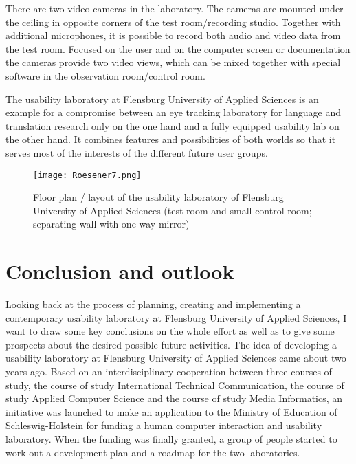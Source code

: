 \begin{
}[h]
\begin{styleBodyTextIndent}
There are two video cameras in the laboratory. The cameras are mounted under the ceiling in opposite corners of the test room/recording studio. Together with additional microphones, it is possible to record both audio and video data from the test room. Focused on the user and on the computer screen or documentation the cameras provide two video views, which can be mixed together with special software in the observation room/control room. 
\end{styleBodyTextIndent}

\begin{styleBodyTextIndent}
The usability laboratory at Flensburg University of Applied Sciences is an example for a compromise between an eye tracking laboratory for language and translation research only on the one hand and a fully equipped usability lab on the other hand. It combines features and possibilities of both worlds so that it serves most of the interests of the different future user groups. 
\end{styleBodyTextIndent}

\begin{figure}[h]
 \texttt{[image: Roesener7.png]}
 \caption{Floor plan / layout of the usability laboratory of Flensburg University of Applied Sciences (test room and small control room; separating wall with one way mirror)
}
 \label{fig:7}
\end{figure} 


\chapter{Conclusion and outlook }

\begin{styleBodyTextIndent}
Looking back at the process of planning, creating and implementing a contemporary usability laboratory at Flensburg University of Applied Sciences, I want to draw some key conclusions on the whole effort as well as to give some prospects about the desired possible future activities. The idea of developing a usability laboratory at Flensburg University of Applied Sciences came about two years ago. Based on an interdisciplinary cooperation between three courses of study, the course of study International Technical Communication, the course of study Applied Computer Science and the course of study Media Informatics, an initiative was launched to make an application to the Ministry of Education of Schleswig-Holstein for funding a human computer interaction and usability laboratory. When the funding was finally granted, a group of people started to work out a development plan and a roadmap for the two laboratories.
\end{styleBodyTextIndent}


\end{
}
